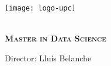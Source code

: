 %

\thispagestyle{empty}
\clearpage
\setcounter{page}{-1}

\makeatletter
\begin{titlepage}
{
    \centering
    \texttt{[image: logo-upc]}
    \null%
    \vspace{13em}
    {\Huge \bfseries \@title \\[1em]
      \Large \scshape Master in Data Science
    \par}
    \vspace{2em}
    {\large \scshape \@date \par}
    \vfill
\begin{center}
\end{center}
    \vspace{5em}

    \vfill
    {\raggedleft \large \@author \par}
    {\raggedleft \large Director: Lluís Belanche \par}
}
\end{titlepage}
\makeatother
